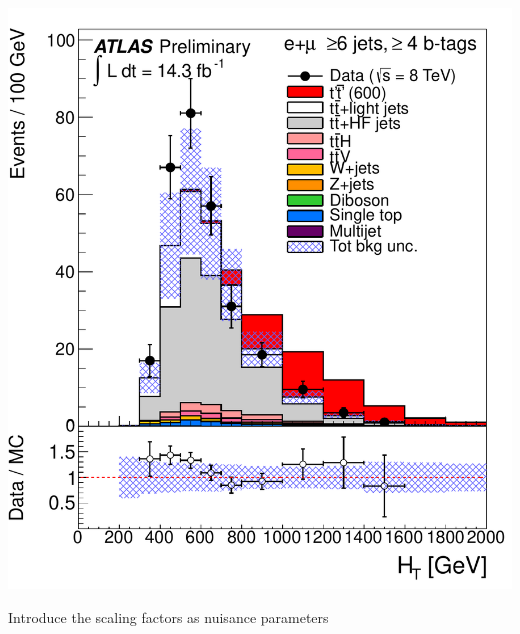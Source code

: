 \begin{frame}
\begin{minipage}{.6\textwidth}
\myskip

\footnotesize

\end{minipage}\begin{minipage}{.4\textwidth}\centering

\includegraphics[width=.9\textwidth]{pics/htx_final/HTAll_6jetin4btagin_ELEMUON}

\end{minipage}

Introduce the scaling factors as {\cccolor nuisance parameters}

\end{frame}




